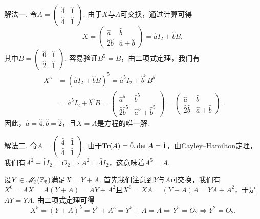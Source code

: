 \begin{solution}
  \begin{inparaenum}[(a)]
    \item {解法一.} 令$A=\begin{pmatrix}
      \hat 4 & \hat 1 \\
      \hat 4 & \hat 1
    \end{pmatrix}$. 由于$X$与$A$可交换，通过计算可得
    \[
      X = \begin{pmatrix}
        \hat a & \hat b \\
        \hat 2\hat b & \hat a + \hat b
      \end{pmatrix} = \hat a I_2 + \hat b B,
    \]
    其中$B=\begin{pmatrix}
      \hat 0 & \hat 1 \\
      \hat 2 & \hat 1
    \end{pmatrix}$. 容易验证$B^5=B$，由二项式定理，我们有
    \begin{align*}
      X^5 & = \left( \hat aI_2 + \hat bB \right)^5 = \hat a^5I_2 + \hat b^5B^5 \\
      & = \hat a^5I_2 + \hat b^5B =
      \begin{pmatrix}
        \hat a^5 & \hat b^5 \\
        \hat 2\hat b^5 & \hat a^5 + \hat b^5
      \end{pmatrix} =
      \begin{pmatrix}
        \hat a & \hat b \\
        \hat 2\hat b & \hat a + \hat b
      \end{pmatrix}.
    \end{align*}
    因此，$\hat a=\hat4,\hat b=\hat2$，且$X=A$是方程的唯一解.

    {\kaishu 解法二.} 令$A=\begin{pmatrix}
      \hat 4 & \hat 1 \\
      \hat 4 & \hat 1
    \end{pmatrix}$. 由于$\operatorname{Tr}(A)=\hat 0,\det A=\hat1$，由Cayley--Hamilton定理，我们有$A^2+\hat1I_2=O_2\Rightarrow A^2=\hat4I_2$，这意味着$A^5=A$.

    设$Y\in\mathscr M_2(\mathbb Z_5)$满足$X=Y+A$. 首先我们注意到$Y$与$A$可交换，我们有$X^6=AX=A(Y+A)=AY+A^2$且$X^6=XA=(Y+A)A=YA+A^2$，于是$AY=YA$. 由二项式定理可得
    \[
      X^5 = (Y + A)^5 = Y^5 + A^5 = Y^5 + A = A \Rightarrow Y^5 = O_2 \Rightarrow Y^2 = O_2.
    \]


\end{inparaenum}
\end{solution}
